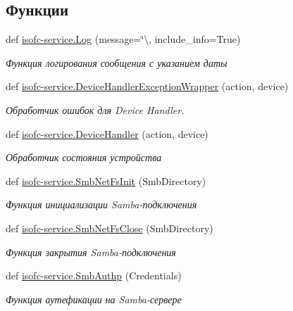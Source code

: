 \subsection*{Функции}
\begin{DoxyCompactItemize}
\item 
def \mbox{\hyperlink{isofc-service_8py_a5cea1ede56356bb641ac929c378c1dd8}{isofc-\/service.\+Log}} (message=\char`\"{}\textbackslash{}, include\+\_\+info=True)
\begin{DoxyCompactList}\small\item\em Функция логирования сообщения с указанием даты \end{DoxyCompactList}\item 
def \mbox{\hyperlink{isofc-service_8py_a5985ea75b9e7f9724d6cb7e742afc890}{isofc-\/service.\+Device\+Handler\+Exception\+Wrapper}} (action, device)
\begin{DoxyCompactList}\small\item\em Обработчик ошибок для Device Handler. \end{DoxyCompactList}\item 
def \mbox{\hyperlink{isofc-service_8py_a72ca4fb69431072fffb6ac2059236878}{isofc-\/service.\+Device\+Handler}} (action, device)
\begin{DoxyCompactList}\small\item\em Обработчик состояния устройства \end{DoxyCompactList}\item 
def \mbox{\hyperlink{isofc-service_8py_a93c21c62e6b4cc45c8128d485d9709fb}{isofc-\/service.\+Smb\+Net\+Fs\+Init}} (Smb\+Directory)
\begin{DoxyCompactList}\small\item\em Функция инициализации Samba-\/подключения \end{DoxyCompactList}\item 
def \mbox{\hyperlink{isofc-service_8py_ab5986a73f27475fd45ad29ad87d7fc0a}{isofc-\/service.\+Smb\+Net\+Fs\+Close}} (Smb\+Directory)
\begin{DoxyCompactList}\small\item\em Функция закрытия Samba-\/подключения \end{DoxyCompactList}\item 
def \mbox{\hyperlink{isofc-service_8py_af127619d58278714c207c58f6d85d52b}{isofc-\/service.\+Smb\+Authp}} (Credentials)
\begin{DoxyCompactList}\small\item\em Функция аутефикации на Samba-\/сервере \end{DoxyCompactList}\item 

\end{DoxyCompactItemize}
